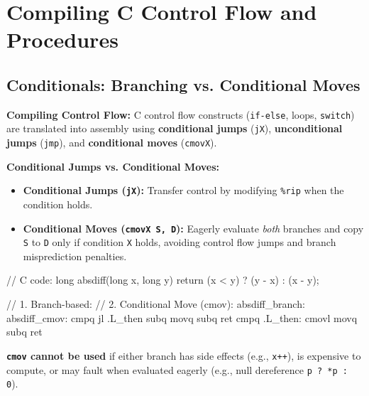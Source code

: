 \section{Compiling C Control Flow and Procedures}

\subsection{Conditionals: Branching vs. Conditional Moves}

\begin{definition}
    \textbf{Compiling Control Flow:} C control flow constructs (\texttt{if-else}, loops, \texttt{switch}) are translated into assembly using \textbf{conditional jumps} (\texttt{jX}), \textbf{unconditional jumps} (\texttt{jmp}), and \textbf{conditional moves} (\texttt{cmovX}).
\end{definition}

\begin{definition}
    \textbf{Conditional Jumps vs. Conditional Moves:}
    \begin{itemize}
        \item \textbf{Conditional Jumps (\texttt{jX}):} Transfer control by modifying \texttt{\%rip} when the condition holds.
        \item \textbf{Conditional Moves (\texttt{cmovX S, D}):} Eagerly evaluate \emph{both} branches and copy \texttt{S} to \texttt{D} only if condition \texttt{X} holds, avoiding control flow jumps and branch misprediction penalties.
    \end{itemize}
\end{definition}

\begin{codeexample}
// C code: long absdiff(long x, long y) { return (x < y) ? (y - x) : (x - y); }

// 1. Branch-based:                 // 2. Conditional Move (cmov):
absdiff_branch:                     absdiff_cmov:
    cmpq  %
    jl    .L_then                       subq  %
    movq  %
    subq  %
    ret                                 cmpq  %
.L_then:                                cmovl %
    movq  %
    subq  %
    ret
\end{codeexample}

\begin{important}
    \textbf{\texttt{cmov} cannot be used} if either branch has side effects (e.g., \texttt{x++}), is expensive to compute, or may fault when evaluated eagerly (e.g., null dereference \texttt{p ? *p : 0}).
\end{important}

